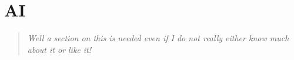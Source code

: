 \section{AI}
\begin{quotation}\textit{
Well a section on this is needed even if I do not really
either know much about it or like it!
}\end{quotation}


